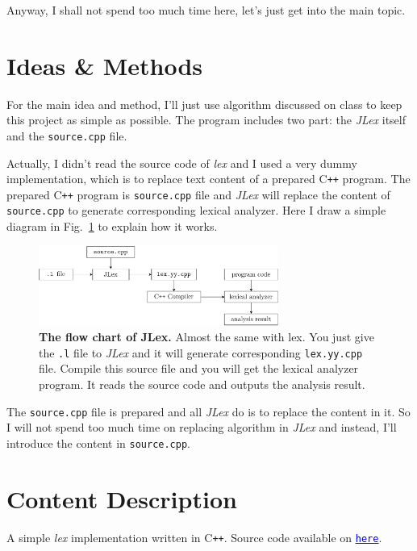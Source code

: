 \documentclass{article}
\begin{document}
Anyway, I shall not spend too much time here, let's just get into the main topic.

\section{Ideas \& Methods}

For the main idea and method, I'll just use algorithm discussed on class to keep this project as simple as possible. The program includes two part: the \textit{JLex} itself and the \texttt{source.cpp} file.

Actually, I didn't read the source code of \textit{lex} and I used a very dummy implementation, which is to replace text content of a prepared C\texttt{++} program. The prepared C\texttt{++} program is \texttt{source.cpp} file and \textit{JLex} will replace the content of \texttt{source.cpp} to generate corresponding lexical analyzer. Here I draw a simple diagram in Fig.~\ref{jlex-process} to explain how it works.

\begin{figure}[htpb]
    \centering
    \includegraphics[width=0.7\textwidth]{img/jlex-process.pdf}
    \caption{\textbf{The flow chart of JLex.} Almost the same with lex. You just give the \texttt{.l} file to \textit{JLex} and it will generate corresponding \texttt{lex.yy.cpp} file. Compile this source file and you will get the lexical analyzer program. It reads the source code and outputs the analysis result.}
    \label{jlex-process}
\end{figure}

The \texttt{source.cpp} file is prepared and all \textit{JLex} do is to replace the content in it. So I will not spend too much time on replacing algorithm in \textit{JLex} and instead, I'll introduce the content in \texttt{source.cpp}.

\section{Content Description}

A simple \textit{lex} implementation written in C\texttt{++}. Source code available on \href{https://github.com/JinBridger/SEU-Compiler-Labwork}{\textcolor{blue}{\texttt{\underline{here}}}}.
\end{document}
